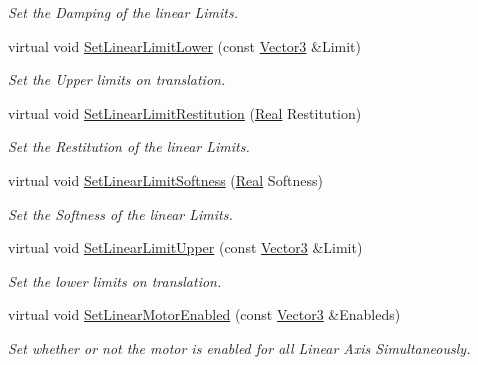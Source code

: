 \begin{DoxyCompactItemize}
\begin{DoxyCompactList}\small\item\em Set the Damping of the linear Limits. \item\end{DoxyCompactList}\item 
virtual void \hyperlink{classMezzanine_1_1Generic6DofConstraint_a5d90b3129b41ab7dbcf545cdc7496a7d}{SetLinearLimitLower} (const \hyperlink{classMezzanine_1_1Vector3}{Vector3} \&Limit)
\begin{DoxyCompactList}\small\item\em Set the Upper limits on translation. \item\end{DoxyCompactList}\item 
virtual void \hyperlink{classMezzanine_1_1Generic6DofConstraint_ace6ec95d4d7332e7320ab86e0a2d9f90}{SetLinearLimitRestitution} (\hyperlink{namespaceMezzanine_a726731b1a7df72bf3583e4a97282c6f6}{Real} Restitution)
\begin{DoxyCompactList}\small\item\em Set the Restitution of the linear Limits. \item\end{DoxyCompactList}\item 
virtual void \hyperlink{classMezzanine_1_1Generic6DofConstraint_aac70c40e57b9a0cefaf99a858a17d9f7}{SetLinearLimitSoftness} (\hyperlink{namespaceMezzanine_a726731b1a7df72bf3583e4a97282c6f6}{Real} Softness)
\begin{DoxyCompactList}\small\item\em Set the Softness of the linear Limits. \item\end{DoxyCompactList}\item 
virtual void \hyperlink{classMezzanine_1_1Generic6DofConstraint_a11540d7b783086bda6f0ccf6bb9e316d}{SetLinearLimitUpper} (const \hyperlink{classMezzanine_1_1Vector3}{Vector3} \&Limit)
\begin{DoxyCompactList}\small\item\em Set the lower limits on translation. \item\end{DoxyCompactList}\item 
virtual void \hyperlink{classMezzanine_1_1Generic6DofConstraint_a507204d3dcb84608b6e69ac3410cb2fc}{SetLinearMotorEnabled} (const \hyperlink{classMezzanine_1_1Vector3}{Vector3} \&Enableds)
\begin{DoxyCompactList}\small\item\em Set whether or not the motor is enabled for all Linear Axis Simultaneously. \item\end{DoxyCompactList}\item 

\end{DoxyCompactItemize}
